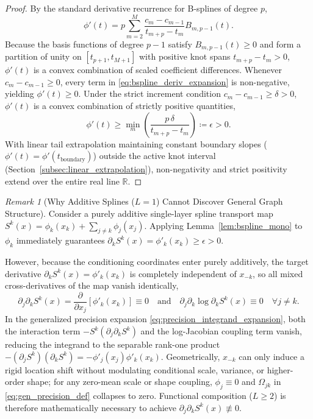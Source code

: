 \documentclass[11pt,a4paper]{article}
\theoremstyle{plain}
\theoremstyle{definition}
\theoremstyle{remark}
\newtheorem{remark}[theorem]{Remark}
\begin{document}
\begin{proof}
By the standard derivative recurrence for B-splines of degree $p$,
\begin{equation}
    \phi'(t) = p \sum_{m=2}^M \frac{c_m - c_{m-1}}{t_{m+p} - t_m} B_{m, p-1}(t).
    \label{eq:bspline_deriv_expansion}
\end{equation}
Because the basis functions of degree $p-1$ satisfy $B_{m, p-1}(t) \ge 0$ and form a partition of unity on $[t_{p+1}, t_{M+1}]$ with positive knot spans $t_{m+p} - t_m > 0$, $\phi'(t)$ is a convex combination of scaled coefficient differences. Whenever $c_m - c_{m-1} \ge 0$, every term in \eqref{eq:bspline_deriv_expansion} is non-negative, yielding $\phi'(t) \ge 0$. Under the strict increment condition $c_m - c_{m-1} \ge \delta > 0$, $\phi'(t)$ is a convex combination of strictly positive quantities,
\begin{equation}
    \phi'(t) \ge \min_m \left( \frac{p\,\delta}{t_{m+p} - t_m} \right) \coloneqq \epsilon > 0.
\end{equation}
With linear tail extrapolation maintaining constant boundary slopes ($\phi'(t) = \phi'(t_{\text{boundary}})$) outside the active knot interval (Section~\ref{subsec:linear_extrapolation}), non-negativity and strict positivity extend over the entire real line $\mathbb{R}$.
\end{proof}

\begin{remark}[Why Additive Splines ($L=1$) Cannot Discover General Graph Structure]
\label{rem:single_layer_failure}
Consider a purely additive single-layer spline transport map $S^k(x) = \phi_k(x_k) + \sum_{j \neq k} \phi_j(x_j)$. Applying Lemma~\ref{lem:bspline_mono} to $\phi_k$ immediately guarantees $\partial_k S^k(x) = \phi'_k(x_k) \ge \epsilon > 0$.

However, because the conditioning coordinates enter purely additively, the target derivative $\partial_k S^k(x) = \phi'_k(x_k)$ is completely independent of $x_{-k}$, so all mixed cross-derivatives of the map vanish identically,
\begin{equation}
    \partial_j \partial_k S^k(x) = \frac{\partial}{\partial x_j} [\phi'_k(x_k)] \equiv 0 \quad \text{and} \quad \partial_j \partial_k \log \partial_k S^k(x) \equiv 0 \quad \forall j \neq k.
\end{equation}
In the generalized precision expansion \eqref{eq:precision_integrand_expansion}, both the interaction term $-S^k(\partial_j \partial_k S^k)$ and the log-Jacobian coupling term vanish, reducing the integrand to the separable rank-one product $-(\partial_j S^k)(\partial_k S^k) = -\phi'_j(x_j)\phi'_k(x_k)$. Geometrically, $x_{-k}$ can only induce a rigid location shift without modulating conditional scale, variance, or higher-order shape; for any zero-mean scale or shape coupling, $\phi_j \equiv 0$ and $\Omega_{jk}$ in \eqref{eq:gen_precision_def} collapses to zero. Functional composition ($L \ge 2$) is therefore mathematically necessary to achieve $\partial_j \partial_k S^k(x) \not\equiv 0$.
\end{remark}
\end{document}
